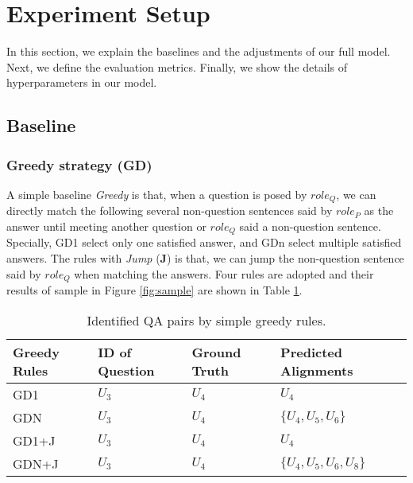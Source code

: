 \section{Experiment Setup}
\label{sec:eval}

In this section, we explain the baselines and the adjustments of our full model. Next, we define the evaluation metrics. Finally, we show the details of hyperparameters in our model.

\subsection{Baseline}
\subsubsection{Greedy strategy (GD)} 
A simple baseline \textit{Greedy} is that, when a question is posed by $role_Q$, we can directly match the following several non-question sentences said by $role_P$ as the answer until meeting another question or $role_Q$ said a non-question sentence. Specially, GD1 select only one satisfied answer, and GDn select multiple satisfied answers. The rules with \textit{Jump} (\textbf{J}) is that, we can jump the non-question sentence said by $role_Q$ when matching the answers. Four rules are adopted and their results of sample in Figure \ref{fig:sample} are shown in Table \ref{tab:res-simple}.


\begin{table}[h]
	\small
    \centering
    \begin{tabular}{p{1.3cm}<{\centering}p{1.3cm}<{\centering}p{1.3cm}<{\centering}p{2.2cm}<{\centering}}
        \toprule[1pt]
         Greedy Rules & ID of Question & Ground Truth & Predicted Alignments\\
         \midrule[0.5pt]
         GD1 & $U_3$ & $U_4$ & $U_4$ \\
         GDN & $U_3$ & $U_4$ & $\{U_4,U_5,U_6\}$ \\
         GD1+J & $U_3$ & $U_4$ & $U_4$ \\
         GDN+J & $U_3$ & $U_4$ & $\{U_4,U_5,U_6,U_8\}$ \\
         \bottomrule[1.2pt]
    \end{tabular}
    \caption{Identified QA pairs by simple greedy rules.}
    \label{tab:res-simple}
\end{table}

